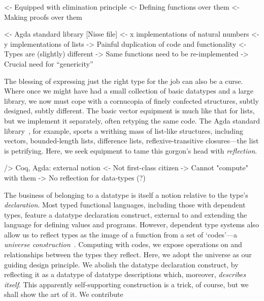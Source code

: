 \documentclass[authoryear]{sigplanconf}
\newenvironment{wstructure}{\comment}{\endcomment}
\begin{document}
\begin{wstructure}
        <- Equipped with elimination principle
            <- Defining functions over them
            <- Making proofs over them
\end{wstructure}


\begin{wstructure}
    <- Agda standard library [Nisse file]
        <- x implementations of natural numbers
        <- y implementations of lists
        -> Painful duplication of code and functionality
            <- Types are (slightly) different
                -> Same functions need to be re-implemented 
        -> Crucial need for ``genericity''
\end{wstructure}

The blessing of expressing just the right type for the job can also be
a curse. Where once we might have had a small collection of basic
datatypes and a large library, we now must cope with a cornucopia of
finely confected structures, subtly designed, subtly different. The
basic vector equipment is much like that for lists, but we implement
it separately, often retyping the same code. The Agda standard
library~\cite{nisse:asl}, for example, sports a writhing mass of
list-like structures, including vectors, bounded-length lists,
difference lists, reflexive-transitive closures---the list is
petrifying. Here, we seek equipment to tame this gorgon's head with
\emph{reflection}.

\begin{wstructure}
        /> Coq, Agda: external notion
            <- Not first-class citizen
            -> Cannot "compute" with them
            -> No reflection for data-types (?)
\end{wstructure}

The business of belonging to a datatype is itself a notion
relative to the type's \emph{declaration}. Most typed functional
languages, including those with dependent types, feature a datatype
declaration construct, external to and extending the language for
defining values and programs. However, dependent type systems also
allow us to reflect types as the image of a function from a set of
`codes'---a \emph{universe construction}~\cite{martin-lof:itt}. 
Computing with codes, we expose operations on and
relationships between the types they reflect. Here, we adopt
the universe as our guiding design principle. We abolish the
datatype declaration construct, by reflecting it as a datatype of
datatype descriptions which, moreover, \emph{describes itself}. This
apparently self-supporting construction is a trick, of course, but
we shall show the art of it. We contribute
\end{document}
